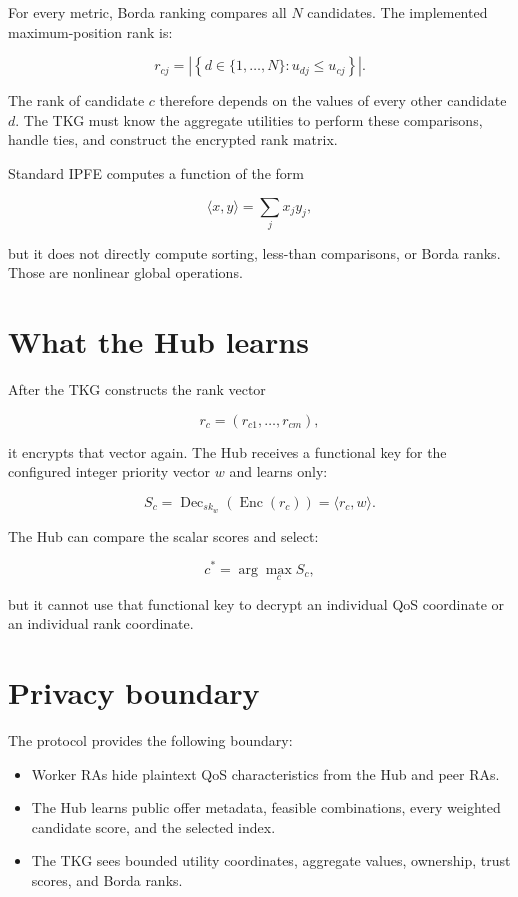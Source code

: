 \documentclass[11pt,a4paper]{article}
\begin{document}
For every metric, Borda ranking compares all $N$ candidates. The implemented
maximum-position rank is:

\begin{equation}
  r_{cj}=\left|\left\{d\in\{1,\ldots,N\}:u_{dj}\leq u_{cj}\right\}\right|.
\end{equation}

The rank of candidate $c$ therefore depends on the values of every other
candidate $d$. The TKG must know the aggregate utilities to perform these
comparisons, handle ties, and construct the encrypted rank matrix.

Standard IPFE computes a function of the form

\begin{equation}
  \langle x,y\rangle=\sum_jx_jy_j,
\end{equation}

but it does not directly compute sorting, less-than comparisons, or Borda
ranks. Those are nonlinear global operations.

\section{What the Hub learns}

After the TKG constructs the rank vector

\[
  r_c=(r_{c1},\ldots,r_{cm}),
\]

it encrypts that vector again. The Hub receives a functional key for the
configured integer priority vector $w$ and learns only:

\begin{equation}
  S_c=\operatorname{Dec}_{sk_w}(\operatorname{Enc}(r_c))
      =\langle r_c,w\rangle.
\end{equation}

The Hub can compare the scalar scores and select:

\begin{equation}
  c^*=\arg\max_c S_c,
\end{equation}

but it cannot use that functional key to decrypt an individual QoS coordinate
or an individual rank coordinate.

\section{Privacy boundary}

The protocol provides the following boundary:

\begin{itemize}
  \item Worker RAs hide plaintext QoS characteristics from the Hub and peer
        RAs.
  \item The Hub learns public offer metadata, feasible combinations, every
        weighted candidate score, and the selected index.
  \item The TKG sees bounded utility coordinates, aggregate values, ownership,
        trust scores, and Borda ranks.
\end{itemize}
\end{document}
